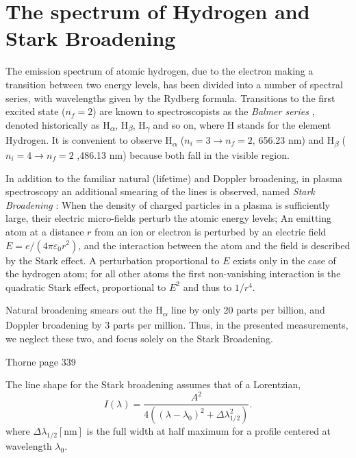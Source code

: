 \documentclass[justified,nofonts,nobib,openany]{tufte-book}
\begin{document}
\section{The spectrum of Hydrogen and Stark Broadening}\label{sec:hydrogen}
The emission spectrum of atomic hydrogen, due to the electron making a transition between two energy levels, has been divided into a number of spectral series, with wavelengths given by the Rydberg formula. Transitions to the first excited state ($n_f=2$) are known to spectroscopists as the \textit{Balmer series} , denoted historically as H\textsubscript{$\alpha$}, H\textsubscript{$\beta$}, H\textsubscript{$\gamma$} and so on, where H stands for the element Hydrogen. It is convenient to observe H\textsubscript{$\alpha$} ($n_i=3 \to n_f=2$, 656.23 nm) and H\textsubscript{$\beta$} ($n_i=4 \to n_f=2$ ,486.13 nm) because both fall in the visible region.

In addition to the familiar natural (lifetime) and Doppler broadening, in plasma spectroscopy an additional smearing of the lines is observed, named \textit{Stark Broadening} : When the density of charged particles in a plasma is sufficiently large, their electric micro-fields perturb the atomic energy levels\cite{Griem1974SpectralPlasmas.}; An emitting atom at a distance $r$ from an ion or electron is perturbed by an electric field $E=e/(4\pi \varepsilon_0 r^2)$, and the interaction between the atom and the field is described by the Stark effect. A perturbation proportional to $E$ exists only in the case of the hydrogen atom; for all other atoms the first non-vanishing interaction is the quadratic Stark effect\cite{Thorne1988Spectrophysics}, proportional to $E^2$ and thus to $1/r^4$.

Natural broadening smears out the H\textsubscript{$\alpha$} line by only 20 parts per billion, and Doppler broadening by 3 parts per million. Thus, in the presented measurements, we neglect these two, and focus solely on the Stark Broadening.

Thorne page 339

The line shape for the Stark broadening assumes that of a Lorentzian,
\begin{equation}
I\left( \lambda \right)=\frac{A^2}{4\left( \left(\lambda-\lambda_0\right)^2+\Delta \lambda_{1/2}^2\right)}. \label{eq:Stark_Broadening}
\end{equation}
where $\Delta \lambda_{1/2}\left[\si{\nm}\right]$ is the full width at half maximum for a profile centered at wavelength $\lambda_0$.
\end{document}
